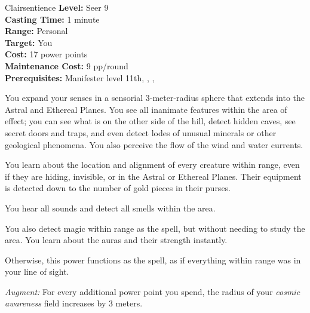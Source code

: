 {Clairsentience}
{
	\textbf{Level:}
	Seer 9\\
	\textbf{Casting Time:}
	1 minute\\
	\textbf{Range:}
	Personal\\
	\textbf{Target:}
	You\\
	\textbf{Cost:}
	17 power points\\
	\textbf{Maintenance Cost:}
	9 pp/round\\
	\textbf{Prerequisites:}
	Manifester level 11th, , , \\
}
{
	You expand your senses in a sensorial 3-meter-radius sphere that extends into the Astral and Ethereal Planes. You see all inanimate features within the area of effect; you can see what is on the other side of the hill, detect hidden caves, see secret doors and traps, and even detect lodes of unusual minerals or other geological phenomena. You also perceive the flow of the wind and water currents.

	You learn about the location and alignment of every creature within range, even if they are hiding, invisible, or in the Astral or Ethereal Planes. Their equipment is detected down to the number of gold pieces in their purses.

	You hear all sounds and detect all smells within the area.

	You also detect magic within range as the  spell, but without needing to study the area. You learn about the auras and their strength instantly.

	Otherwise, this power functions as the  spell, as if everything within range was in your line of sight.

	\textit{Augment:} For every additional power point you spend, the radius of your \emph{cosmic awareness} field increases by 3 meters.
}